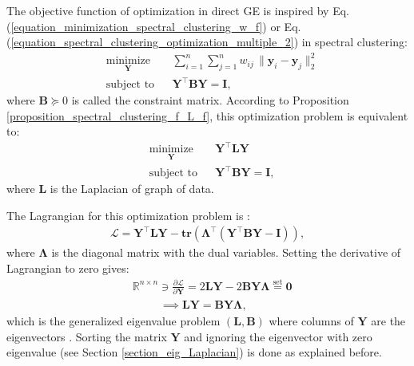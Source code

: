 \documentclass[lang=cn,10pt]{gorgeousnbook}
\numberwithin{equation}{section}%
\numberwithin{figure}{section}%
\begin{document}
The objective function of optimization in direct GE \cite{yan2005graph,yan2006graph} is inspired by Eq. (\ref{equation_minimization_spectral_clustering_w_f}) or Eq. (\ref{equation_spectral_clustering_optimization_multiple_2}) in spectral clustering:
\begin{equation}\label{equation_optimization_direct_graph_embedding}
\begin{aligned}
& \underset{\boldsymbol{Y}}{\text{minimize}}
& & \sum_{i=1}^n \sum_{j=1}^n w_{ij}\, \|\boldsymbol{y}_i - \boldsymbol{y}_j\|_2^2 \\
& \text{subject to}
& & 
\boldsymbol{Y}^\top \boldsymbol{B} \boldsymbol{Y} = \boldsymbol{I},
\end{aligned}
\end{equation}
where $\boldsymbol{B} \succeq 0$ is called the constraint matrix. 
According to Proposition \ref{proposition_spectral_clustering_f_L_f}, this optimization problem is equivalent to:
\begin{equation}\label{equation_optimization_direct_graph_embedding_2}
\begin{aligned}
& \underset{\boldsymbol{Y}}{\text{minimize}}
& & \boldsymbol{Y}^\top \boldsymbol{L} \boldsymbol{Y} \\
& \text{subject to}
& & 
\boldsymbol{Y}^\top \boldsymbol{B} \boldsymbol{Y} = \boldsymbol{I},
\end{aligned}
\end{equation}
where $\boldsymbol{L}$ is the Laplacian of graph of data. 

The Lagrangian for this optimization problem is \cite{boyd2004convex}:
\begin{align*}
\mathcal{L} = \boldsymbol{Y}^\top \boldsymbol{L} \boldsymbol{Y} - \textbf{tr}(\boldsymbol{\Lambda}^\top (\boldsymbol{Y}^\top \boldsymbol{B} \boldsymbol{Y} - \boldsymbol{I})),
\end{align*}
where $\boldsymbol{\Lambda}$ is the diagonal matrix with the dual variables. Setting the derivative of Lagrangian to zero gives:
\begin{align}
&\mathbb{R}^{n \times n} \ni \frac{\partial \mathcal{L}}{\partial \boldsymbol{Y}} = 2 \boldsymbol{L} \boldsymbol{Y} - 2 \boldsymbol{B} \boldsymbol{Y} \boldsymbol{\Lambda} \overset{\text{set}}{=} \boldsymbol{0} \nonumber \\
&~~~~~~~~~~~ \implies \boldsymbol{L} \boldsymbol{Y} = \boldsymbol{B} \boldsymbol{Y} \boldsymbol{\Lambda},
\end{align}
which is the generalized eigenvalue problem $(\boldsymbol{L}, \boldsymbol{B})$ where columns of $\boldsymbol{Y}$ are the eigenvectors \cite{ghojogh2019eigenvalue}. 
Sorting the matrix $\boldsymbol{Y}$ and ignoring the eigenvector with zero eigenvalue (see Section \ref{section_eig_Laplacian}) is done as explained before. 
\end{document}

